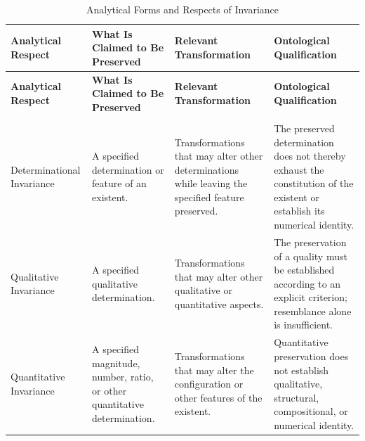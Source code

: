 \begin{center}
\small
\renewcommand{\arraystretch}{1.28}
\setlength{\tabcolsep}{4pt}

\begin{longtable}{
    >{\raggedright\arraybackslash}p{2.9cm}
    >{\raggedright\arraybackslash}p{3.0cm}
    >{\raggedright\arraybackslash}p{3.2cm}
    >{\raggedright\arraybackslash}p{4.4cm}
}

\caption{Analytical Forms and Respects of Invariance}
\label{tab:forms-of-invariance} \\

\toprule
\textbf{Analytical Respect}
&
\textbf{What Is Claimed to Be Preserved}
&
\textbf{Relevant Transformation}
&
\textbf{Ontological Qualification}
\\
\midrule
\endfirsthead

\toprule
\textbf{Analytical Respect}
&
\textbf{What Is Claimed to Be Preserved}
&
\textbf{Relevant Transformation}
&
\textbf{Ontological Qualification}
\\
\midrule
\endhead

\midrule
\multicolumn{4}{r}{\footnotesize\textit{Continued on next page}}\\
\endfoot

\bottomrule
\endlastfoot

Determinational Invariance
&
A specified determination or feature of an existent.
&
Transformations that may alter other determinations
while leaving the specified feature preserved.
&
The preserved determination does not thereby
exhaust the constitution of the existent or
establish its numerical identity.
\\

\addlinespace

\quad Qualitative Invariance
&
A specified qualitative determination.
&
Transformations that may alter other qualitative
or quantitative aspects.
&
The preservation of a quality must be established
according to an explicit criterion; resemblance
alone is insufficient.
\\

\addlinespace

\quad Quantitative Invariance
&
A specified magnitude, number, ratio, or other
quantitative determination.
&
Transformations that may alter the configuration
or other features of the existent.
&
Quantitative preservation does not establish
qualitative, structural, compositional, or
numerical identity.
\\

\midrule


\end{longtable}
\end{center}
